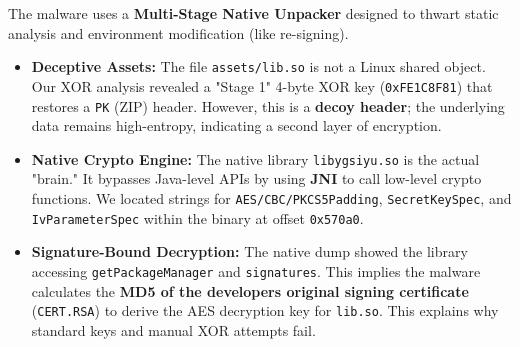 \documentclass[
]{article}
\begin{document}
The malware uses a \textbf{Multi-Stage Native Unpacker} designed to
thwart static analysis and environment modification (like re-signing).

\begin{itemize}
\item
  \textbf{Deceptive Assets:} The file \texttt{assets/lib.so} is not a
  Linux shared object. Our XOR analysis revealed a "Stage 1" 4-byte XOR
  key (\texttt{0xFE1C8F81}) that restores a \texttt{PK} (ZIP) header.
  However, this is a \textbf{decoy header}; the underlying data remains
  high-entropy, indicating a second layer of encryption.
\item
  \textbf{Native Crypto Engine:} The native library
  \texttt{libygsiyu.so} is the actual "brain." It bypasses Java-level
  APIs by using \textbf{JNI} to call low-level crypto functions. We
  located strings for \texttt{AES/CBC/PKCS5Padding},
  \texttt{SecretKeySpec}, and \texttt{IvParameterSpec} within the binary
  at offset \texttt{0x570a0}.
\item
  \textbf{Signature-Bound Decryption:} The native dump showed the
  library accessing \texttt{getPackageManager} and \texttt{signatures}.
  This implies the malware calculates the \textbf{MD5 of the
  developer\textquotesingle s original signing certificate}
  (\texttt{CERT.RSA}) to derive the AES decryption key for
  \texttt{lib.so}. This explains why standard keys and manual XOR
  attempts fail.
\end{itemize}
\end{document}

